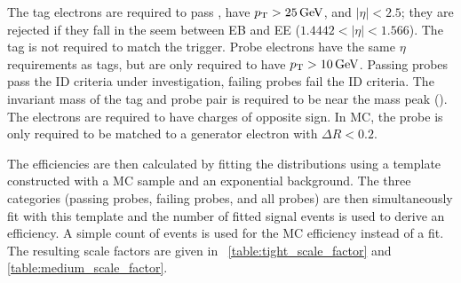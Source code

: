 The tag electrons are required to pass \EGTIGHT, have $p_{\mathrm{T}} > 25 \,\text{Ge\hspace{-.08em}V}$, and
$|\eta| < 2.5$; they are rejected if they fall in the seem between EB and EE
($1.4442 < |\eta| < 1.566$). The tag is not required to match the trigger.
Probe electrons have the same $\eta$ requirements as tags, but are only
required to have $p_{\mathrm{T}} > 10 \,\text{Ge\hspace{-.08em}V}$. Passing probes pass the ID criteria under
investigation, failing probes fail the ID criteria. The invariant mass of the
tag and probe pair is required to be near the \Z mass peak (\MassRange). The
electrons are required to have charges of opposite sign. In MC, the probe is
only required to be matched to a generator electron with $\Delta R < 0.2$.

The efficiencies are then calculated by fitting the \mee distributions using a
template constructed with a \Ztoee MC sample and an exponential background. The
three categories (passing probes, failing probes, and all probes) are then
simultaneously fit with this template and the number of fitted signal events is
used to derive an efficiency. A simple count of events is used for the MC
efficiency instead of a fit. The resulting scale factors are given in
\TABS~\ref{table:tight_scale_factor} and \ref{table:medium_scale_factor}.




